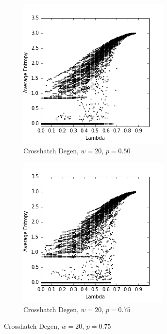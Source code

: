 \documentclass[a4paper,11pt,twoside]{report}
\begin{document}
\begin{figure}[htp]
\begin{subfigure}[t]{0.4\textwidth}
\end{subfigure}
~
\begin{subfigure}[t]{0.4\textwidth}
  \centering
  \includegraphics[width=\textwidth]{ch6_figs/ch_w20_p50_entropy_scatter}
  \caption{Crosshatch Degen, $w=20$, $p=0.50$}

\end{subfigure}

\begin{subfigure}[t]{0.4\textwidth}
  \centering
  \includegraphics[width=\textwidth]{ch6_figs/ch_w20_p75_entropy_scatter}
  \caption{Crosshatch Degen, $w=20$, $p=0.75$}


\end{subfigure}
\end{figure}
\end{document}
